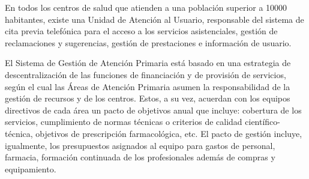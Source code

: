 En todos los centros de salud que atienden a una población superior a 10000 habitantes, existe una Unidad de Atención al Usuario, responsable del sistema de cita previa telefónica para el acceso a los servicios asistenciales, gestión de reclamaciones y sugerencias, gestión de prestaciones e información de usuario.

El Sistema de Gestión de Atención Primaria está basado en una estrategia de descentralización de las funciones de financiación y de provisión de servicios, según el cual las Áreas de Atención Primaria asumen la responsabilidad de la gestión de recursos y de los centros. Estos, a su vez, acuerdan con los equipos directivos de cada área un pacto de objetivos anual que incluye: cobertura de los servicios, cumplimiento de normas técnicas o criterios de calidad científico-técnica, objetivos de prescripción farmacológica, etc. El pacto de gestión incluye, igualmente, los presupuestos asignados al equipo para gastos de personal, farmacia, formación continuada de los profesionales además de compras y equipamiento.